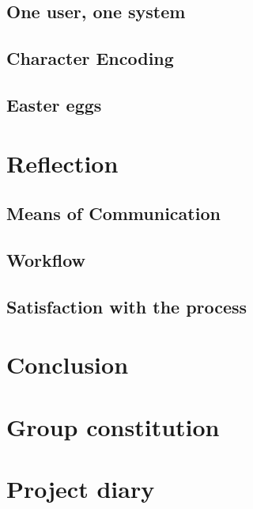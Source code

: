 \documentclass[a4paper,11pt]{article}
\begin{document}
\subsection{One user, one system}
\label{sec:One user one system}


\subsection{Character Encoding}


\subsection{Easter eggs}


\pagebreak
\section{Reflection}


\subsection{Means of Communication}


\subsection{Workflow}


\subsection{Satisfaction with the process}


\pagebreak
\section{Conclusion}
\label{sec:Conclusion}


\pagebreak
\appendix
\section{Group constitution}
\label{sec:Constitution}



\pagebreak
\section{Project diary}
\label{sec:Diary}
\end{document}
